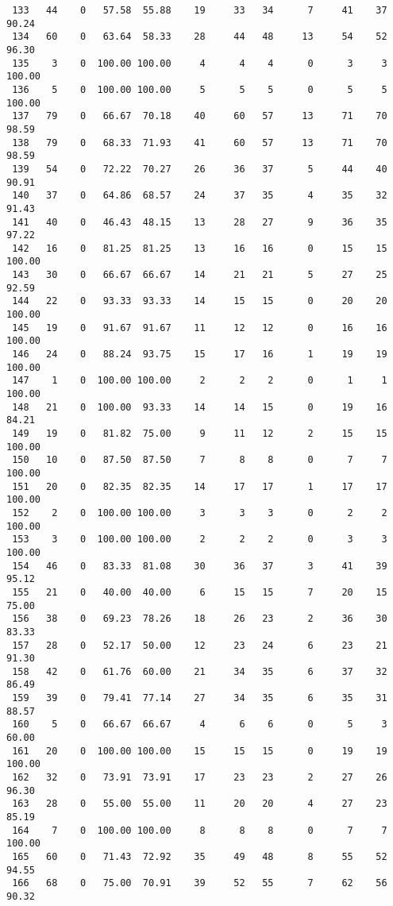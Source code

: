 \begin{verbatim}
 133   44    0   57.58  55.88    19     33   34      7     41    37    90.24
 134   60    0   63.64  58.33    28     44   48     13     54    52    96.30
 135    3    0  100.00 100.00     4      4    4      0      3     3   100.00
 136    5    0  100.00 100.00     5      5    5      0      5     5   100.00
 137   79    0   66.67  70.18    40     60   57     13     71    70    98.59
 138   79    0   68.33  71.93    41     60   57     13     71    70    98.59
 139   54    0   72.22  70.27    26     36   37      5     44    40    90.91
 140   37    0   64.86  68.57    24     37   35      4     35    32    91.43
 141   40    0   46.43  48.15    13     28   27      9     36    35    97.22
 142   16    0   81.25  81.25    13     16   16      0     15    15   100.00
 143   30    0   66.67  66.67    14     21   21      5     27    25    92.59
 144   22    0   93.33  93.33    14     15   15      0     20    20   100.00
 145   19    0   91.67  91.67    11     12   12      0     16    16   100.00
 146   24    0   88.24  93.75    15     17   16      1     19    19   100.00
 147    1    0  100.00 100.00     2      2    2      0      1     1   100.00
 148   21    0  100.00  93.33    14     14   15      0     19    16    84.21
 149   19    0   81.82  75.00     9     11   12      2     15    15   100.00
 150   10    0   87.50  87.50     7      8    8      0      7     7   100.00
 151   20    0   82.35  82.35    14     17   17      1     17    17   100.00
 152    2    0  100.00 100.00     3      3    3      0      2     2   100.00
 153    3    0  100.00 100.00     2      2    2      0      3     3   100.00
 154   46    0   83.33  81.08    30     36   37      3     41    39    95.12
 155   21    0   40.00  40.00     6     15   15      7     20    15    75.00
 156   38    0   69.23  78.26    18     26   23      2     36    30    83.33
 157   28    0   52.17  50.00    12     23   24      6     23    21    91.30
 158   42    0   61.76  60.00    21     34   35      6     37    32    86.49
 159   39    0   79.41  77.14    27     34   35      6     35    31    88.57
 160    5    0   66.67  66.67     4      6    6      0      5     3    60.00
 161   20    0  100.00 100.00    15     15   15      0     19    19   100.00
 162   32    0   73.91  73.91    17     23   23      2     27    26    96.30
 163   28    0   55.00  55.00    11     20   20      4     27    23    85.19
 164    7    0  100.00 100.00     8      8    8      0      7     7   100.00
 165   60    0   71.43  72.92    35     49   48      8     55    52    94.55
 166   68    0   75.00  70.91    39     52   55      7     62    56    90.32

\end{verbatim}
